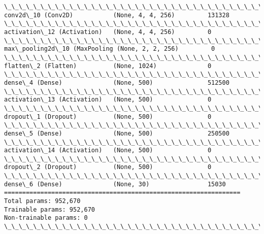 \documentclass[11pt]{article}
\begin{document}
\begin{Verbatim}[commandchars=\\\{\}]
\_\_\_\_\_\_\_\_\_\_\_\_\_\_\_\_\_\_\_\_\_\_\_\_\_\_\_\_\_\_\_\_\_\_\_\_\_\_\_\_\_\_\_\_\_\_\_\_\_\_\_\_\_\_\_\_\_\_\_\_\_\_\_\_\_
conv2d\_10 (Conv2D)           (None, 4, 4, 256)         131328    
\_\_\_\_\_\_\_\_\_\_\_\_\_\_\_\_\_\_\_\_\_\_\_\_\_\_\_\_\_\_\_\_\_\_\_\_\_\_\_\_\_\_\_\_\_\_\_\_\_\_\_\_\_\_\_\_\_\_\_\_\_\_\_\_\_
activation\_12 (Activation)   (None, 4, 4, 256)         0         
\_\_\_\_\_\_\_\_\_\_\_\_\_\_\_\_\_\_\_\_\_\_\_\_\_\_\_\_\_\_\_\_\_\_\_\_\_\_\_\_\_\_\_\_\_\_\_\_\_\_\_\_\_\_\_\_\_\_\_\_\_\_\_\_\_
max\_pooling2d\_10 (MaxPooling (None, 2, 2, 256)         0         
\_\_\_\_\_\_\_\_\_\_\_\_\_\_\_\_\_\_\_\_\_\_\_\_\_\_\_\_\_\_\_\_\_\_\_\_\_\_\_\_\_\_\_\_\_\_\_\_\_\_\_\_\_\_\_\_\_\_\_\_\_\_\_\_\_
flatten\_2 (Flatten)          (None, 1024)              0         
\_\_\_\_\_\_\_\_\_\_\_\_\_\_\_\_\_\_\_\_\_\_\_\_\_\_\_\_\_\_\_\_\_\_\_\_\_\_\_\_\_\_\_\_\_\_\_\_\_\_\_\_\_\_\_\_\_\_\_\_\_\_\_\_\_
dense\_4 (Dense)              (None, 500)               512500    
\_\_\_\_\_\_\_\_\_\_\_\_\_\_\_\_\_\_\_\_\_\_\_\_\_\_\_\_\_\_\_\_\_\_\_\_\_\_\_\_\_\_\_\_\_\_\_\_\_\_\_\_\_\_\_\_\_\_\_\_\_\_\_\_\_
activation\_13 (Activation)   (None, 500)               0         
\_\_\_\_\_\_\_\_\_\_\_\_\_\_\_\_\_\_\_\_\_\_\_\_\_\_\_\_\_\_\_\_\_\_\_\_\_\_\_\_\_\_\_\_\_\_\_\_\_\_\_\_\_\_\_\_\_\_\_\_\_\_\_\_\_
dropout\_1 (Dropout)          (None, 500)               0         
\_\_\_\_\_\_\_\_\_\_\_\_\_\_\_\_\_\_\_\_\_\_\_\_\_\_\_\_\_\_\_\_\_\_\_\_\_\_\_\_\_\_\_\_\_\_\_\_\_\_\_\_\_\_\_\_\_\_\_\_\_\_\_\_\_
dense\_5 (Dense)              (None, 500)               250500    
\_\_\_\_\_\_\_\_\_\_\_\_\_\_\_\_\_\_\_\_\_\_\_\_\_\_\_\_\_\_\_\_\_\_\_\_\_\_\_\_\_\_\_\_\_\_\_\_\_\_\_\_\_\_\_\_\_\_\_\_\_\_\_\_\_
activation\_14 (Activation)   (None, 500)               0         
\_\_\_\_\_\_\_\_\_\_\_\_\_\_\_\_\_\_\_\_\_\_\_\_\_\_\_\_\_\_\_\_\_\_\_\_\_\_\_\_\_\_\_\_\_\_\_\_\_\_\_\_\_\_\_\_\_\_\_\_\_\_\_\_\_
dropout\_2 (Dropout)          (None, 500)               0         
\_\_\_\_\_\_\_\_\_\_\_\_\_\_\_\_\_\_\_\_\_\_\_\_\_\_\_\_\_\_\_\_\_\_\_\_\_\_\_\_\_\_\_\_\_\_\_\_\_\_\_\_\_\_\_\_\_\_\_\_\_\_\_\_\_
dense\_6 (Dense)              (None, 30)                15030     
=================================================================
Total params: 952,670
Trainable params: 952,670
Non-trainable params: 0
\_\_\_\_\_\_\_\_\_\_\_\_\_\_\_\_\_\_\_\_\_\_\_\_\_\_\_\_\_\_\_\_\_\_\_\_\_\_\_\_\_\_\_\_\_\_\_\_\_\_\_\_\_\_\_\_\_\_\_\_\_\_\_\_\_

    \end{Verbatim}
\end{document}
